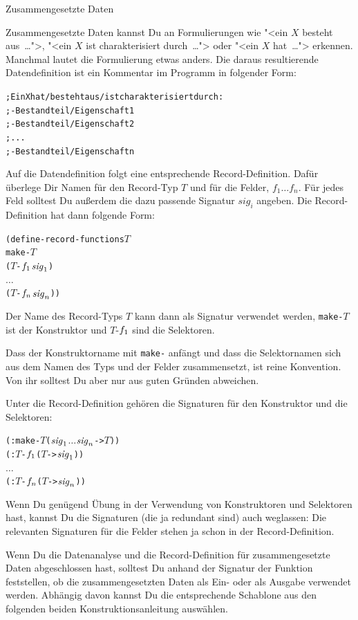 \begin{konstruktionsanleitung}{Zusammengesetzte Daten}

Zusammengesetzte Daten kannst Du an Formulierungen wie "<ein $X$
besteht aus~\ldots">, "<ein $X$ ist charakterisiert durch~\ldots">
oder "<ein $X$ hat~\ldots"> erkennen.  Manchmal lautet die
Formulierung etwas anders.  Die daraus resultierende Datendefinition
ist ein Kommentar im Programm in folgender Form:
%
\begin{alltt}
; Ein X hat / besteht aus / ist charakterisiert durch:
; - Bestandteil / Eigenschaft 1
; - Bestandteil / Eigenschaft 2
; ...
; - Bestandteil / Eigenschaft n
\end{alltt}
%
Auf die Datendefinition folgt eine entsprechende Record-Definition.
Dafür überlege Dir Namen für den Record-Typ $T$ und für die
Felder, $f_1 \ldots f_n$.  Für jedes Feld solltest Du außerdem
die dazu passende Signatur $\mathit{sig}_{i}$ angeben.
Die Record-Definition hat dann folgende
Form:
%
\begin{alltt}
(define-record-functions \(T\)
  make-\(T\)
  (\(T\)-\(f\sb{1}\) \(\mathit{sig}\sb{1}\))
  \(\ldots\)
  (\(T\)-\(f\sb{n}\) \(\mathit{sig}\sb{n}\)))
\end{alltt}
%
Der Name des Record-Typs \(T\) kann dann als Signatur verwendet
werden, \texttt{make-\(T\)} ist der Konstruktor und \(T\)-\(f\sb{1}\)
sind die Selektoren.

Dass der Konstruktorname mit \texttt{make-} anfängt und dass die
Selektornamen sich aus dem Namen des Typs und der Felder
zusammensetzt, ist reine Konvention.  Von ihr solltest Du aber nur aus
guten Gründen abweichen.

Unter die Record-Definition gehören die Signaturen für den Konstruktor
und die Selektoren:
%
\begin{alltt}
(: make-\(T\) (\(\mathit{sig}\sb{1}\) \(\ldots\) \(\mathit{sig}\sb{n}\) -> \(T\)))
(: \(T\)-\(f\sb{1}\) (\(T\) -> \(\mathit{sig}\sb{1}\)))
\(\ldots\)
(: \(T\)-\(f\sb{n}\) (\(T\) -> \(\mathit{sig}\sb{n}\)))
\end{alltt}
%
\end{konstruktionsanleitung}
%
Wenn Du genügend Übung in der Verwendung von Konstruktoren und
Selektoren hast, kannst Du die Signaturen (die ja redundant sind)
auch weglassen: Die relevanten Signaturen für die Felder stehen ja
schon in der Record-Definition.

Wenn Du die Datenanalyse und die Record-Definition für
zusammengesetzte Daten abgeschlossen hast, solltest Du anhand der
Signatur der Funktion feststellen, ob die zusammengesetzten Daten als
Ein- oder als Ausgabe verwendet werden.  Abhängig davon kannst Du die
entsprechende Schablone aus den folgenden beiden
Konstruktionsanleitung auswählen.

